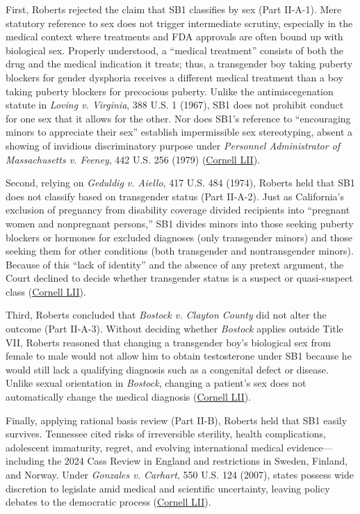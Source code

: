 \documentclass[12pt]{article}
\begin{document}
First, Roberts rejected the claim that SB1 classifies by sex (Part II-A-1). Mere statutory reference to sex does not trigger intermediate scrutiny, especially in the medical context where treatments and FDA approvals are often bound up with biological sex. Properly understood, a ``medical treatment'' consists of both the drug and the medical indication it treats; thus, a transgender boy taking puberty blockers for gender dysphoria receives a different medical treatment than a boy taking puberty blockers for precocious puberty. Unlike the antimiscegenation statute in \textit{Loving v. Virginia}, 388 U.S. 1 (1967), SB1 does not prohibit conduct for one sex that it allows for the other. Nor does SB1's reference to ``encouraging minors to appreciate their sex'' establish impermissible sex stereotyping, absent a showing of invidious discriminatory purpose under \textit{Personnel Administrator of Massachusetts v. Feeney}, 442 U.S. 256 (1979) (\href{https://www.law.cornell.edu/supremecourt/text/23-477}{Cornell LII}).

Second, relying on \textit{Geduldig v. Aiello}, 417 U.S. 484 (1974), Roberts held that SB1 does not classify based on transgender status (Part II-A-2). Just as California's exclusion of pregnancy from disability coverage divided recipients into ``pregnant women and nonpregnant persons,'' SB1 divides minors into those seeking puberty blockers or hormones for excluded diagnoses (only transgender minors) and those seeking them for other conditions (both transgender and nontransgender minors). Because of this ``lack of identity'' and the absence of any pretext argument, the Court declined to decide whether transgender status is a suspect or quasi-suspect class (\href{https://www.law.cornell.edu/supremecourt/text/23-477}{Cornell LII}).

Third, Roberts concluded that \textit{Bostock v. Clayton County} did not alter the outcome (Part II-A-3). Without deciding whether \textit{Bostock} applies outside Title VII, Roberts reasoned that changing a transgender boy's biological sex from female to male would not allow him to obtain testosterone under SB1 because he would still lack a qualifying diagnosis such as a congenital defect or disease. Unlike sexual orientation in \textit{Bostock}, changing a patient's sex does not automatically change the medical diagnosis (\href{https://www.law.cornell.edu/supremecourt/text/23-477}{Cornell LII}).

Finally, applying rational basis review (Part II-B), Roberts held that SB1 easily survives. Tennessee cited risks of irreversible sterility, health complications, adolescent immaturity, regret, and evolving international medical evidence---including the 2024 Cass Review in England and restrictions in Sweden, Finland, and Norway. Under \textit{Gonzales v. Carhart}, 550 U.S. 124 (2007), states possess wide discretion to legislate amid medical and scientific uncertainty, leaving policy debates to the democratic process (\href{https://www.law.cornell.edu/supremecourt/text/23-477}{Cornell LII}).
\end{document}
